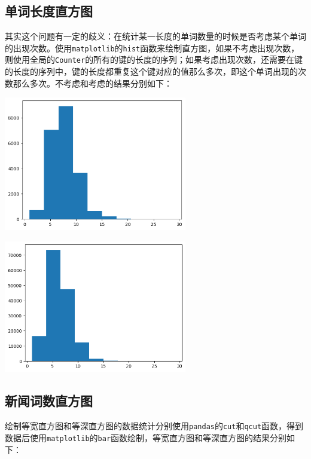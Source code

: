 \documentclass[12pt, UTF8]{article}
\begin{document}
\subsection{单词长度直方图}
其实这个问题有一定的歧义：在统计某一长度的单词数量的时候是否考虑某个单词的出现次数。使用\lstinline|matplotlib|的\lstinline|hist|函数来绘制直方图，如果不考虑出现次数，则使用全局的\lstinline|Counter|的所有的键的长度的序列；如果考虑出现次数，还需要在键的长度的序列中，键的长度都重复这个键对应的值那么多次，即这个单词出现的次数那么多次。不考虑和考虑的结果分别如下：

\begin{center}
  \includegraphics[width=0.6\textwidth]{wordlen_hist0.png}
\end{center}

\begin{center}
  \includegraphics[width=0.6\textwidth]{wordlen_hist1.png}
\end{center}

\subsection{新闻词数直方图}
绘制等宽直方图和等深直方图的数据统计分别使用\lstinline|pandas|的\lstinline|cut|和\lstinline|qcut|函数，得到数据后使用\lstinline|matplotlib|的\lstinline|bar|函数绘制，等宽直方图和等深直方图的结果分别如下：
\end{document}
